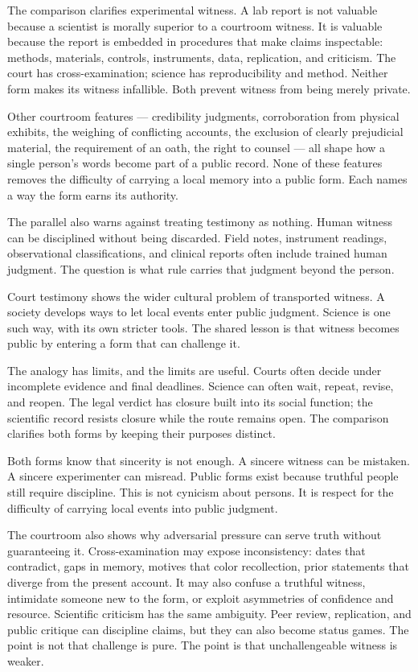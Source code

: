 The comparison clarifies experimental witness. A lab report is not
valuable because a scientist is morally superior to a courtroom witness.
It is valuable because the report is embedded in procedures that make
claims inspectable: methods, materials, controls, instruments, data,
replication, and criticism. The court has cross-examination; science
has reproducibility and method. Neither form makes its witness
infallible. Both prevent witness from being merely private.

Other courtroom features --- credibility judgments, corroboration from
physical exhibits, the weighing of conflicting accounts, the exclusion
of clearly prejudicial material, the requirement of an oath, the right
to counsel --- all shape how a single person's words become part of a
public record. None of these features removes the difficulty of
carrying a local memory into a public form. Each names a way the form
earns its authority.

The parallel also warns against treating testimony as nothing. Human
witness can be disciplined without being discarded. Field notes,
instrument readings, observational classifications, and clinical reports
often include trained human judgment. The question is what rule carries
that judgment beyond the person.

Court testimony shows the wider cultural problem of transported witness.
A society develops ways to let local events enter public judgment.
Science is one such way, with its own stricter tools. The shared lesson
is that witness becomes public by entering a form that can challenge
it.

The analogy has limits, and the limits are useful. Courts often decide
under incomplete evidence and final deadlines. Science can often wait,
repeat, revise, and reopen. The legal verdict has closure built into
its social function; the scientific record resists closure while the
route remains open. The comparison clarifies both forms by keeping their
purposes distinct.

Both forms know that sincerity is not enough. A sincere witness can be
mistaken. A sincere experimenter can misread. Public forms exist
because truthful people still require discipline. This is not cynicism
about persons. It is respect for the difficulty of carrying local
events into public judgment.

The courtroom also shows why adversarial pressure can serve truth
without guaranteeing it. Cross-examination may expose inconsistency:
dates that contradict, gaps in memory, motives that color recollection,
prior statements that diverge from the present account. It may also
confuse a truthful witness, intimidate someone new to the form, or
exploit asymmetries of confidence and resource. Scientific criticism
has the same ambiguity. Peer review, replication, and public critique
can discipline claims, but they can also become status games. The
point is not that challenge is pure. The point is that unchallengeable
witness is weaker.

